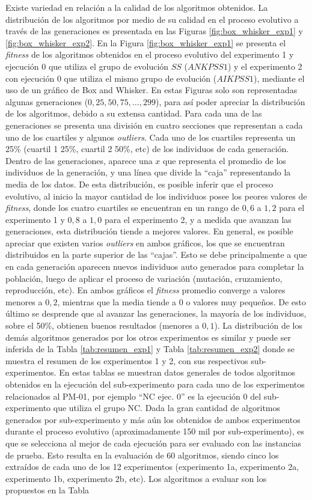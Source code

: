 Existe variedad en relación a la calidad de los algoritmos obtenidos. La distribución de los algoritmos por medio de su calidad en el proceso evolutivo a través de las generaciones es presentada en las Figuras \ref{fig:box_whisker_exp1} y \ref{fig:box_whisker_exp2}. En la Figura \ref{fig:box_whisker_exp1} se presenta el \textit{fitness} de los algoritmos obtenidos en el proceso evolutivo del experimento 1 y ejecución 0 que utiliza el grupo de evolución $SS$ ($ANKPSS1$) y el experimento 2 con ejecución 0 que utiliza el mismo grupo de evolución ($AIKPSS1$), mediante el uso de un gráfico de Box and Whisker. En estas Figuras solo son representadas algunas generaciones ($0, 25, 50, 75, …, 299$), para así poder apreciar la distribución de los algoritmos, debido a su extensa cantidad. Para cada una de las generaciones se presenta una división en cuatro secciones que representan a cada uno de los cuartiles y algunos \textit{outliers}. Cada uno de los cuartiles representa un 25\% (cuartil 1 25\%, cuartil 2 50\%, etc) de los individuos de cada generación. Dentro de las generaciones, aparece una $x$ que representa el promedio de los individuos de la generación, y una línea que divide la “caja” representando la media de los datos. De esta distribución, es posible inferir que el proceso evolutivo, al inicio la mayor cantidad de los individuos posee los peores valores de \textit{fitness}, donde los cuatro cuartiles se encuentran en un rango de $0,6$ a $1,2$ para el experimento 1 y $0,8$ a $1,0$ para el experimento 2, y a medida que avanzan las generaciones, esta distribución tiende a mejores valores. En general, es posible apreciar que existen varios \textit{outliers} en ambos gráficos, los que se encuentran distribuidos en la parte superior de las “cajas”. Esto se debe principalmente a que en cada generación aparecen nuevos individuos auto generados para completar la población, luego de aplicar el proceso de variación (mutación, cruzamiento, reproducción, etc). En ambos gráficos el \textit{fitness} promedio converge a valores menores a $0,2$, mientras que la media tiende a $0$ o valores muy pequeños. De esto último se desprende que al avanzar las generaciones, la mayoría de los individuos, sobre el 50\%, obtienen buenos resultados (menores a $0,1$). La distribución de los demás algoritmos generados por los otros experimentos es similar y puede ser inferida de la Tabla \ref{tab:resumen_exp1} y Tabla \ref{tab:resumen_exp2} donde se muestra el resumen de los experimentos 1 y 2, con sus respectivos sub-experimentos. En estas tablas se muestran datos generales de todos algoritmos obtenidos en la ejecución del sub-experimento para cada uno de los experimentos relacionados al PM-01, por ejemplo “NC ejec. 0” es la ejecución 0 del sub-experimento que utiliza el grupo NC. Dada la gran cantidad de algoritmos generados por sub-experimento y más aún los obtenidos de ambos experimentos durante el proceso evolutivo (aproximadamente 150 mil por sub-experimento), es que se selecciona al mejor de cada ejecución para ser evaluado con las instancias de prueba. Esto resulta en la evaluación de 60 algoritmos, siendo cinco los extraídos de cada uno de los 12 experimentos (experimento 1a, experimento 2a, experimento 1b, experimento 2b, etc). Los algoritmos a evaluar son los propuestos en la Tabla 